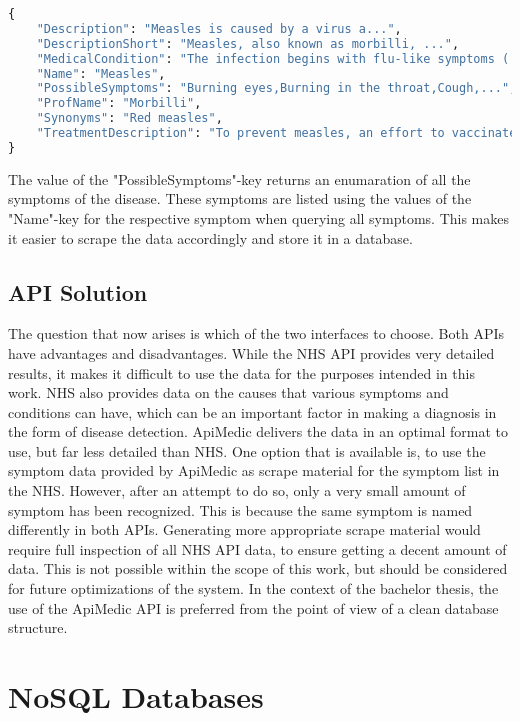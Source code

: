 \begin{lstlisting}[language=Python, caption={Response for the ApiMedic API (single issue)}]
{
	"Description": "Measles is caused by a virus a...",
	"DescriptionShort": "Measles, also known as morbilli, ...",
	"MedicalCondition": "The infection begins with flu-like symptoms ( ...",
	"Name": "Measles",
	"PossibleSymptoms": "Burning eyes,Burning in the throat,Cough,...",
	"ProfName": "Morbilli",
	"Synonyms": "Red measles",
	"TreatmentDescription": "To prevent measles, an effort to vaccinate ..."
}
\end{lstlisting}
\noindent 
The value of the "PossibleSymptoms"-key returns an enumaration of all the symptoms of the disease. These symptoms are listed using the values of the "Name"-key for the respective symptom when querying all symptoms. This makes it easier to scrape the data accordingly and store it in a database.

\subsection{API Solution}
The question that now arises is which of the two interfaces to choose. Both APIs have advantages and disadvantages. While the NHS API provides very detailed results, it makes it difficult to use the data for the purposes intended in this work. NHS also provides data on the causes that various symptoms and conditions can have, which can be an important factor in making a diagnosis in the form of disease detection. ApiMedic delivers the data in an optimal format to use, but far less detailed than NHS. One option that is available is, to use the symptom data provided by ApiMedic as scrape material for the symptom list in the NHS. However, after an attempt to do so, only a very small amount of symptom has been recognized. This is because the same symptom is named differently in both APIs. Generating more appropriate scrape material would require full inspection of all NHS API data, to ensure getting a decent amount of data. This is not possible within the scope of this work, but should be considered for future optimizations of the system.  In the context of the bachelor thesis, the use of the ApiMedic API is preferred from the point of view of a clean database structure.

\section{NoSQL Databases}

